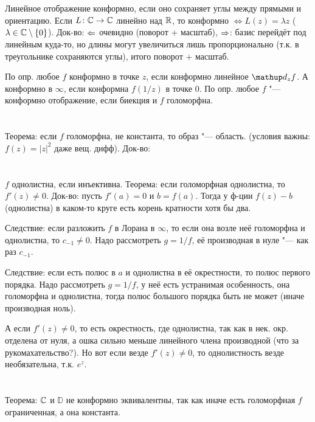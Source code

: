 \section{} %
	Линейное отображение конформно, если оно сохраняет углы между прямыми и ориентацию.
	Если $L \colon \mathbb{C} \to \mathbb{C}$ линейно над $\mathbb{R}$, то конформно $\iff L(z)=\lambda z$ ($\lambda \in \mathbb{C} \mathbin{\backslash} \{0\}$).
	Док-во: $\Leftarrow$ очевидно (поворот + масштаб), $\Rightarrow$: базис перейдёт под линейным куда-то,
	но длины могут увеличиться лишь пропорционально (т.к. в треугольнике сохраняются углы),
	итого поворот + масштаб.

	По опр. любое $f$ конформно в точке $z$, если конформно линейное $\d_z f$.
	А конформно в $\infty$, если конформна $f(1/z)$ в точке 0.
	По опр. любое $f$ "--- конформно отображение, если биекция и $f$ голоморфна.

\section{} %
	Теорема: если $f$ голоморфна, не константа, то образ "--- область.
	(условия важны: $f(z)=|z|^2$ даже вещ. дифф).
	Док-во: \TODO

\section{} %
	$f$ однолистна, если инъективна.
	Теорема: если голоморфная однолистна, то $f'(z)\neq 0$.
	Док-во: пусть $f'(a)=0$ и $b=f(a)$.
	Тогда у ф-ции $f(z)-b$ (однолистна) в каком-то круге есть корень кратности хотя бы два.
	\TODO

	Следствие: если разложить $f$ в Лорана в $\infty$, то если она возле неё голоморфна и однолистна,
	то $c_{-1}\neq 0$.
	Надо рассмотреть $g=1/f$, её производная в нуле "--- как раз $c_{-1}$.

	Следствие: если есть полюс в $a$ и однолистна в её окрестности, то полюс первого порядка.
	Надо рассмотреть $g=1/f$, у неё есть устранимая особенность, она голоморфна и однолистна,
	тогда полюс большого порядка быть не может (иначе производная ноль).

	А если $f'(z)\neq 0$, то есть окрестность, где однолистна, так как
	в нек. окр. отделена от нуля, а ошка сильно меньше линейного члена производной (что за рукомахательство?).
	Но вот если везде $f'(z) \neq 0$, то однолистность везде необязательна, т.к. $e^z$.

\section{} %
	Теорема: $\mathbb{C}$ и $\mathbb{D}$ не конформно эквивалентны, так как иначе есть голоморфная $f$
	ограниченная, а она константа.

